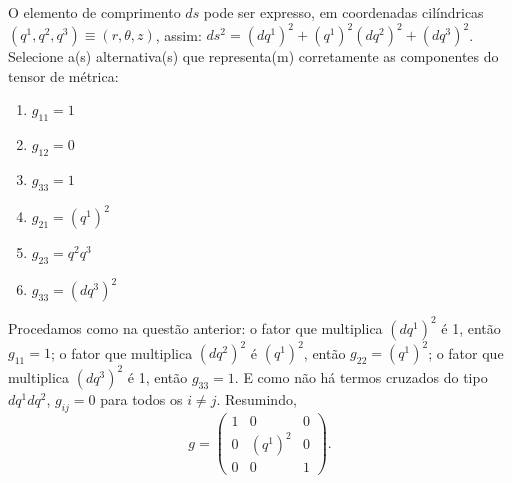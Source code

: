 \begin{question}
    O elemento de comprimento $ds$ pode ser expresso, em coordenadas cilíndricas $(q^1, q^2, q^3) \equiv (r, \theta, z)$, assim: $ds^2 = (dq^1)^2 + (q^1)^2 (dq^2)^2 + (dq^3)^2$.
    Selecione a(s) alternativa(s) que representa(m) corretamente as componentes do tensor de métrica:
    \begin{enumerate}
      \item $g_{11} = 1$ \rightanswer
      \item $g_{12} = 0$ \rightanswer
      \item $g_{33} = 1$ \rightanswer
      \item $g_{21} = (q^1)^2$
      \item $g_{23} = q^2 q^3$
      \item $g_{33} = (dq^3)^2$
    \end{enumerate}

    \begin{solution}
      Procedamos como na questão anterior: o fator que multiplica $(dq^1)^2$ é 1, então $g_{11} = 1$;
      o fator que multiplica $(dq^2)^2$ é $(q^1)^2$, então $g_{22} = (q^1)^2$;
      o fator que multiplica $(dq^3)^2$ é 1, então $g_{33} = 1$.
      E como não há termos cruzados do tipo $dq^1 dq^2$, $g_{ij} = 0$ para todos os $i \ne j$.
      Resumindo,
      \begin{equation*}
        g = \begin{pmatrix}
          1 &       0 & 0 \\
          0 & (q^1)^2 & 0 \\
          0 &       0 & 1
        \end{pmatrix}.
      \end{equation*}
    \end{solution}
\end{question}